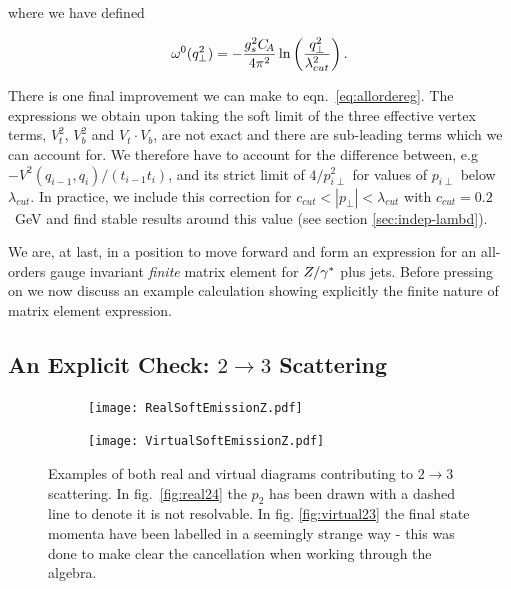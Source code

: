 		where we have defined

		\begin{align}
		  \label{eq:omega0}
		  \omega^0(q_{\perp}^2) = - \frac{g_s^2 C_{\!A}}{4\pi^2} \ln\left( \frac{q_\perp^2}{\lambda_{cut}^2}\right).
		\end{align}

		There is one final improvement we can make to eqn.~\eqref{eq:allordereg}.  The expressions
		we obtain upon taking the soft limit of the three effective vertex terms, $V^2_t$, $V^2_b$
		and $V_t\cdot V_b$, are not exact and there are sub-leading terms which we can account for.
		We therefore have to account for the difference between, e.g $-V^2(q_{i-1},q_{i})/(t_{i-1} t_i)$,
		and its strict limit of $4/p_{i\perp}^2$ for values of $p_{i\perp}$ below $\lambda_{cut}$.  In
		practice, we include this correction for $c_{cut}<|p_\perp|<\lambda_{cut}$ with
		$c_{cut} = 0.2$~GeV and find stable results around this value (see section \ref{sec:indep-lambd}).

		We are, at last, in a position to move forward and form an expression for an all-orders
		gauge invariant \emph{finite} matrix element for $Z/\gamma^*$ plus jets.  Before pressing on
		we now discuss an example calculation showing explicitly the finite nature of
		matrix element expression.

	\subsection{An Explicit Check: $2\rightarrow3$ Scattering}

		\begin{figure}[bth]
			\centering
			\begin{subfigure}[b]{0.48\textwidth}
				\texttt{[image: RealSoftEmissionZ.pdf]}
				\caption{}
				\label{fig:real24}
			\end{subfigure}
			\begin{subfigure}[b]{0.48\textwidth}
				\centering
				\texttt{[image: VirtualSoftEmissionZ.pdf]}
				\caption{}
				\label{fig:virtual23}
			\end{subfigure}

			\caption{Examples of both real and virtual diagrams contributing to
			$2\rightarrow3$ scattering. In fig.~\eqref{fig:real24} the $p_2$ has been
			drawn with a dashed line to denote it is not resolvable.  In fig.
			\eqref{fig:virtual23} the final state momenta have been labelled in a
			seemingly strange way - this was done to make clear the cancellation
			when working through the algebra.}
			\label{fig:2to}
		\end{figure}

